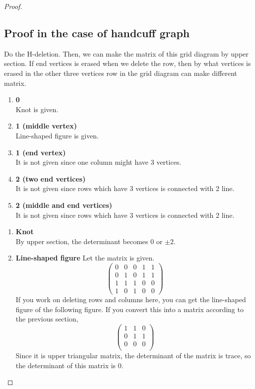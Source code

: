 \documentclass{article}
\begin{document}
\begin{proof}
\subsection{Proof in the case of handcuff graph}
Do the H-deletion. Then, we can make the matrix of this grid diagram by upper section. If end vertices is erased when we delete the row, then by what vertices is erased in the other three vertices row in the grid diagram can make different matrix.
\begin{enumerate}
    \item \textbf{0}\\
    Knot is given.
    \item \textbf{1 (middle vertex)}\\
    Line-shaped figure is given.
    \item \textbf{1 (end vertex)}\\
    It is not given since one column might have 3 vertices.
    \item \textbf{2 (two end vertices)}\\
    It is not given since rows which have 3 vertices is connected with 2 line.
    \item \textbf{2 (middle and end vertices)}\\
    It is not given since rows which have 3 vertices is connected with 2 line.
\end{enumerate}

\begin{enumerate}
    \item \textbf{Knot}\\
    By upper section, the determinant becomes 0 or $\pm 2$.
    \item \textbf{Line-shaped figure}
    Let the matrix is given.
    $$\begin{pmatrix}
        0 & 0 & 0 & 1 & 1\\
        0 & 1 & 0 & 1 & 1\\
        1 & 1 & 1 & 0 & 0\\
        1 & 0 & 1 & 0 & 0
    \end{pmatrix}$$
    If you work on deleting rows and columns here, you can get the line-shaped figure of the following figure. If you convert this into a matrix according to the previous section,
    $$\begin{pmatrix}
        1 & 1 & 0 \\
        0 & 1 & 1 \\
        0 & 0 & 0 \\
    \end{pmatrix}$$
    Since it is upper triangular matrix, the determinant of the matrix is trace, so the determinant of this matrix is 0.
\end{enumerate}
\end{proof}
\end{document}
